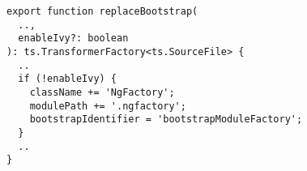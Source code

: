 \begin{verbatim}
export function replaceBootstrap(
  ..,
  enableIvy?: boolean
): ts.TransformerFactory<ts.SourceFile> {
  ..
  if (!enableIvy) {
    className += 'NgFactory';
    modulePath += '.ngfactory';
    bootstrapIdentifier = 'bootstrapModuleFactory';
  }
  ..
}
\end{verbatim}
